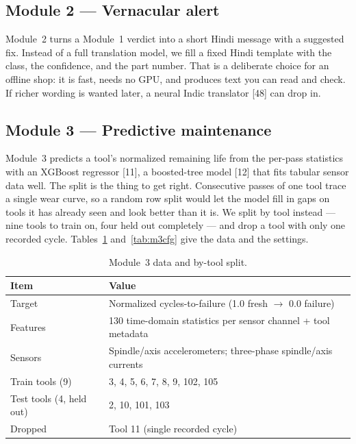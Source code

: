 \documentclass[12pt]{article}
\begin{document}
\subsection{Module 2 --- Vernacular alert}

Module~2 turns a Module~1 verdict into a short Hindi message with a suggested fix.
Instead of a full translation model, we fill a fixed Hindi template with the class,
the confidence, and the part number. That is a deliberate choice for an offline
shop: it is fast, needs no GPU, and produces text you can read and check. If richer
wording is wanted later, a neural Indic translator [48] can drop in.

\subsection{Module 3 --- Predictive maintenance}

Module~3 predicts a tool's normalized remaining life from the per-pass statistics
with an XGBoost regressor [11], a boosted-tree model [12] that fits tabular sensor
data well. The split is the thing to get right. Consecutive passes of one tool trace
a single wear curve, so a random row split would let the model fill in gaps on tools
it has already seen and look better than it is. We split by tool instead --- nine
tools to train on, four held out completely --- and drop a tool with only one
recorded cycle. Tables~\ref{tab:m3data} and~\ref{tab:m3cfg} give the data and the
settings.

\begin{table}[H]
\caption{Module~3 data and by-tool split.}
\label{tab:m3data}
\centering
\small
\begin{tabular}{@{}p{4.0cm}p{8.4cm}@{}}
\toprule
Item & Value \\
\midrule
Target & Normalized cycles-to-failure (1.0 fresh $\to$ 0.0 failure) \\
Features & 130 time-domain statistics per sensor channel + tool metadata \\
Sensors & Spindle/axis accelerometers; three-phase spindle/axis currents \\
Train tools (9) & 3, 4, 5, 6, 7, 8, 9, 102, 105 \\
Test tools (4, held out) & 2, 10, 101, 103 \\
Dropped & Tool 11 (single recorded cycle) \\
\bottomrule
\end{tabular}
\end{table}
\end{document}
